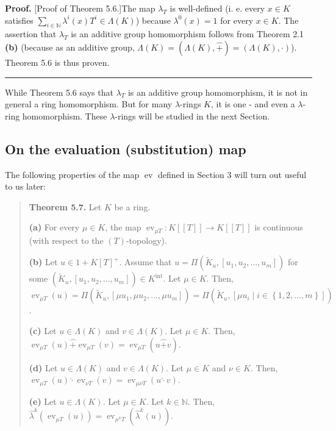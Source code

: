 \documentclass[numbers=enddot,12pt,final,onecolumn,notitlepage]{scrartcl}%
\newenvironment{proof}[1][Proof]{\noindent\textbf{#1.} }{\ \rule{0.5em}{0.5em}}
\begin{document}
\begin{proof}
[Proof of Theorem 5.6.]The map $\lambda_{T}$ is well-defined (i. e. every
$x\in K$ satisfies $\sum\limits_{i\in\mathbb{N}}\lambda^{i}\left(  x\right)
T^{i}\in\Lambda\left(  K\right)  $) because $\lambda^{0}\left(  x\right)  =1$
for every $x\in K$. The assertion that $\lambda_{T}$ is an additive group
homomorphism follows from Theorem 2.1 \textbf{(b)} (because as an additive
group, $\Lambda\left(  K\right)  =\left(  \Lambda\left(  K\right)
,\widehat{+}\right)  =\left(  \Lambda\left(  K\right)  ,\cdot\right)  $).
Theorem 5.6 is thus proven.
\end{proof}

While Theorem 5.6 says that $\lambda_{T}$ is an additive group homomorphism,
it is not in general a ring homomorphism. But for many $\lambda$-rings $K$, it
is one - and even a $\lambda$-ring homomorphism. These $\lambda$-rings will be
studied in the next Section.

\subsection{On the evaluation (substitution) map}

The following properties of the map $\operatorname*{ev}$ defined in Section 3
will turn out useful to us later:

\begin{quote}
\textbf{Theorem 5.7.} Let $K$ be a ring.

\textbf{(a)} For every $\mu\in K$, the map $\operatorname*{ev}_{\mu
T}:K\left[  \left[  T\right]  \right]  \rightarrow K\left[  \left[  T\right]
\right]  $ is continuous (with respect to the $\left(  T\right)  $-topology).

\textbf{(b)} Let $u\in1+K\left[  T\right]  ^{+}$. Assume that $u=\Pi\left(
\widetilde{K}_{u},\left[  u_{1},u_{2},...,u_{m}\right]  \right)  $ for some
$\left(  \widetilde{K}_{u},\left[  u_{1},u_{2},...,u_{m}\right]  \right)  \in
K^{\operatorname*{int}}$. Let $\mu\in K$. Then, $\operatorname*{ev}_{\mu
T}\left(  u\right)  =\Pi\left(  \widetilde{K}_{u},\left[  \mu u_{1},\mu
u_{2},...,\mu u_{m}\right]  \right)  =\Pi\left(  \widetilde{K}_{u},\left[  \mu
u_{i}\mid i\in\left\{  1,2,...,m\right\}  \right]  \right)  $.

\textbf{(c)} Let $u\in\Lambda\left(  K\right)  $ and $v\in\Lambda\left(
K\right)  $. Let $\mu\in K$. Then, $\operatorname*{ev}_{\mu T}\left(
u\right)  \widehat{+}\operatorname*{ev}_{\mu T}\left(  v\right)
=\operatorname*{ev}_{\mu T}\left(  u\widehat{+}v\right)  $.

\textbf{(d)} Let $u\in\Lambda\left(  K\right)  $ and $v\in\Lambda\left(
K\right)  $. Let $\mu\in K$ and $\nu\in K$. Then, $\operatorname*{ev}_{\mu
T}\left(  u\right)  \widehat{\cdot}\operatorname*{ev}_{\nu T}\left(  v\right)
=\operatorname*{ev}_{\mu\nu T}\left(  u\widehat{\cdot}v\right)  $.

\textbf{(e)} Let $u\in\Lambda\left(  K\right)  $. Let $\mu\in K$. Let
$k\in\mathbb{N}$. Then, $\widehat{\lambda}^{k}\left(  \operatorname*{ev}_{\mu
T}\left(  u\right)  \right)  =\operatorname*{ev}_{\mu^{k}T}\left(
\widehat{\lambda}^{k}\left(  u\right)  \right)  $.
\end{quote}
\end{document}
